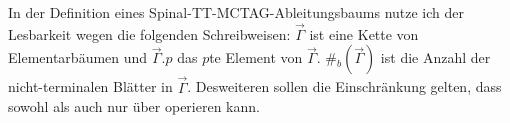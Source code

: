 

In der Definition eines Spinal-TT-MCTAG-Ableitungsbaums nutze ich der Lesbarkeit wegen die folgenden Schreibweisen: $\vec{\Gamma}$ ist eine Kette von Elementarbäumen und $\vec{\Gamma}.p$ das $p$te Element von $\vec{\Gamma}$. \#$_b(\vec{\Gamma})$ ist die Anzahl der nicht-terminalen Blätter in $\vec{\Gamma}$. Desweiteren sollen die Einschränkung gelten, dass sowohl  als auch  nur über  operieren kann.

